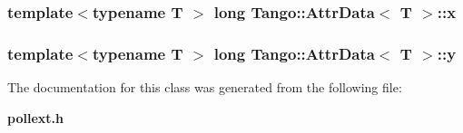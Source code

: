 \subsubsection[{x}]{\setlength{\rightskip}{0pt plus 5cm}template$<$typename T $>$ long {\bf Tango\-::\-Attr\-Data}$<$ T $>$\-::x}\label{classTango_1_1AttrData_a8e08e9668434a58b543989599dd82ecc}
\subsubsection[{y}]{\setlength{\rightskip}{0pt plus 5cm}template$<$typename T $>$ long {\bf Tango\-::\-Attr\-Data}$<$ T $>$\-::y}\label{classTango_1_1AttrData_a32c887ce84b2549b5c597134a8f989a4}


The documentation for this class was generated from the following file\-:\begin{DoxyCompactItemize}
\item 
{\bf pollext.\-h}\end{DoxyCompactItemize}
